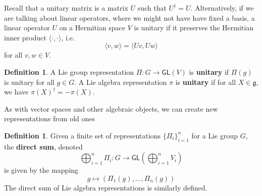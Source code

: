 \documentclass[psamsfonts]{amsart}
\theoremstyle{definition}
\newtheorem{defn}[thm]{Definition}
\theoremstyle{remark}
\newcommand{\GL}{\mathsf{GL}}
\newcommand{\g}{\mathfrak{g}}
\begin{document}
Recall that a unitary matrix is a matrix $U$ such that $U^\dagger = U$. Alternatively, if we are talking about linear operators, where we might not have have fixed a basis, a linear operator $U$ on a Hermitian space $V$ is unitary if it preserves the Hermitian inner product $\langle \cdot, \cdot \rangle$, i.e.
$$\langle v, w \rangle = \langle Uv, Uw \rangle $$
for all $v,w \in V$.

\begin{defn}
A Lie group representation $\Pi: G \to \GL(V)$ is \textbf{unitary} if $\Pi(g)$ is unitary for all $g \in G$. A Lie algebra representation $\pi$ is \textbf{unitary} if for all $X \in \g$, we have $\pi(X)^\dagger = -\pi(X)$.
\end{defn}

As with vector spaces and other algebraic objects, we can create new representations from old ones

\begin{defn}
Given a finite set of representations $\{\Pi_i\}_{i =1}^n$ for a Lie group $G$, the \textbf{direct sum}, denoted
$$\bigoplus_{i = 1}^n \Pi_i : G \to \GL\left(\bigoplus_{i=1}^n V_i\right)$$
is given by the mapping
$$g \mapsto \left( \Pi_1(g), \ldots, \Pi_n(g) \right) $$
The direct sum of Lie algebra representations is similarly defined.
\end{defn}
\end{document}
